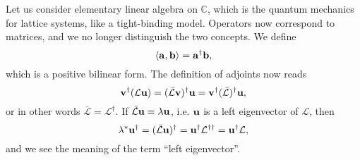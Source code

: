 \documentclass[hyperref, a4paper]{article}
\begin{document}
Let us consider elementary linear algebra on $\mathbb{C}$, which is the quantum mechanics for lattice systems, like a tight-binding model.
Operators now correspond to matrices, and we no longer distinguish the two concepts.
We define 
\begin{equation}
    \expval{\vb{a}, \vb{b}} = \vb{a}^\dagger \vb{b},
\end{equation}
which is a positive bilinear form. The definition of adjoints now reads 
\[
    \vb{v}^\dagger (\mathcal{L} \vb{u}) = (\bar{\mathcal{L}} \vb{v})^\dagger \vb{u} = \vb{v}^\dagger (\bar{\mathcal{L}})^\dagger \vb{u},
\]
or in other words $\bar{\mathcal{L}} = \mathcal{L}^\dagger$.
If $\bar{\mathcal{L}} \vb{u} = \lambda \vb{u}$, i.e. $\vb{u}$ is a left eigenvector of $\mathcal{L}$, then 
\[
    \lambda^* \vb{u}^\dagger = (\bar{\mathcal{L}} \vb{u})^\dagger = \vb{u}^\dagger \mathcal{L}^{\dagger \dagger} 
    = \vb{u}^\dagger \mathcal{L},
\]
and we see the meaning of the term ``left eigenvector''.
\end{document}
